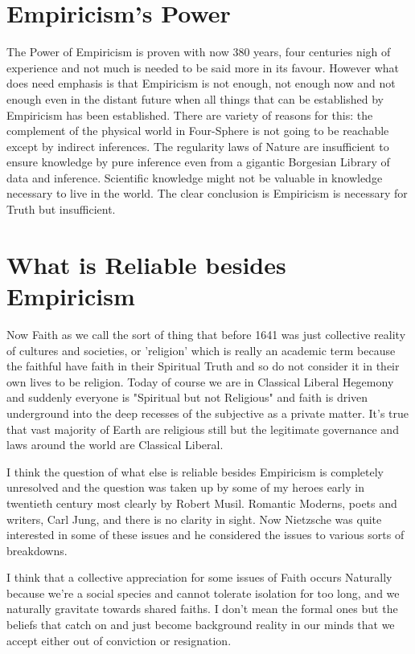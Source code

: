 \documentclass{amsart}
\begin{document}
\section{Empiricism's Power}

The Power of Empiricism is proven with now 380 years, four centuries nigh of experience and not much is needed to be said more in its favour.  However what does need emphasis is that Empiricism is not enough, not enough now and not enough even in the distant future when all things that can be established by Empiricism has been established. There are variety of reasons for this: the complement of the physical world in Four-Sphere is not going to be reachable except by indirect inferences.  The regularity laws of Nature are insufficient to ensure knowledge by pure inference even from a gigantic Borgesian Library of data and inference.  Scientific knowledge might not be valuable in knowledge necessary to live in the world.  The clear conclusion is Empiricism is necessary for Truth but insufficient.

\section{What is Reliable besides Empiricism}

Now Faith as we call the sort of thing that before 1641 was just collective reality of cultures and societies, or 'religion' which is really an academic term because the faithful have faith in their Spiritual Truth and so do not consider it in their own lives to be religion.  Today of course we are in Classical Liberal Hegemony and suddenly everyone is "Spiritual but not Religious" and faith is driven underground into the deep recesses of the subjective as a private matter.  It's true that vast majority of Earth are religious still but the legitimate governance and laws around the world are Classical Liberal.  

I think the question of what else is reliable besides Empiricism is completely unresolved and the question was taken up by some of my heroes early in twentieth century most clearly by Robert Musil.  Romantic Moderns, poets and writers, Carl Jung, and there is no clarity in sight.  Now Nietzsche was quite interested in some of these issues and he considered the issues to various sorts of breakdowns.  

I think that a collective appreciation for some issues of Faith occurs Naturally because we're a social species and cannot tolerate isolation for too long, and we naturally gravitate towards shared faiths.  I don't mean the formal ones but the beliefs that catch on and just become background reality in our minds that we accept either out of conviction or resignation.
\end{document}
